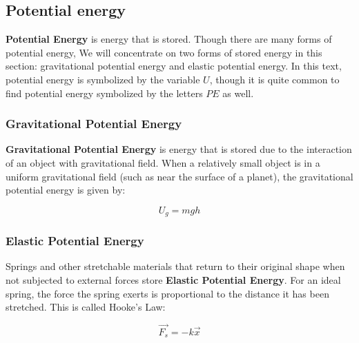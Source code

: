 	
	\subsection{Potential energy}  
	\textbf{Potential Energy} is energy that is stored.  Though there are many forms of potential energy, We will concentrate on two forms of stored energy in this section: gravitational potential energy and elastic potential energy.  In this text, potential energy is symbolized by the variable $U$, though it is quite common to find potential energy symbolized by the letters $PE$ as well. 
	
	\subsubsection{Gravitational Potential Energy}   
	\textbf{Gravitational Potential Energy} is energy that is stored due to the interaction of an object with gravitational field.  When a relatively small object is in a uniform gravitational field (such as near the surface of a planet), the gravitational potential energy is given by: 
			\begin{mdframed}[backgroundcolor=orange!20!white]
		\begin{equation}
		U_g = mgh
		\label{eqn:gravitationalpotentialenergy}
		\end{equation}
	\end{mdframed}
	
 
	
	
	
	\subsubsection{Elastic Potential Energy}  
	
	Springs and other stretchable materials that return to their original shape when not subjected to external forces store \textbf{Elastic Potential Energy}.  For an ideal spring, the force the spring exerts is proportional to the distance it has been stretched.  This is called Hooke's Law: 
	
		\begin{mdframed}[backgroundcolor=orange!20!white]
		\begin{equation}
		\overrightarrow{F_s} = -k\vec{x}
		\label{eqn:hookeslaw}
		\end{equation}
	\end{mdframed}
	
